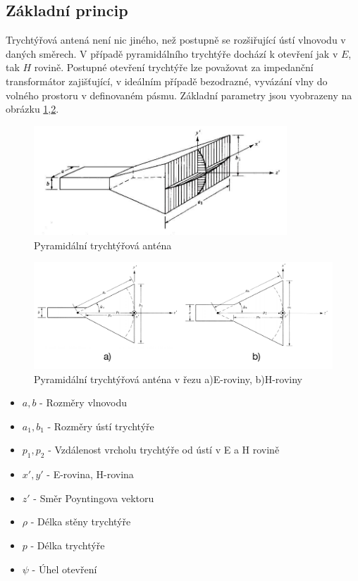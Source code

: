 \subsection{Základní princip}
Trychtýřová antená není nic jiného, než postupně se rozšiřující ústí vlnovodu v daných směrech. V případě pyramidálního trychtýře dochází k otevření jak v $E$, tak $H$ rovině. Postupné otevření trychtýře lze považovat za impedanční transformátor zajišťující, v ideálním případě bezodrazné, vyvázání vlny do volného prostoru v definovaném pásmu.
Základní parametry jsou vyobrazeny na obrázku \ref{fig:horn},\ref{fig:hornEH}.

\begin{figure}[h]
\begin{center}
\includegraphics[width=9.5cm]{pics/horn}
\caption{Pyramidální trychtýřová anténa \cite{ConstantineTheory}}
\label{fig:horn}
\end{center}
\end{figure}

\begin{figure}[h]
\begin{center}
\includegraphics[width=15cm]{pics/hornEH}
\caption{Pyramidální trychtýřová anténa v řezu a)E-roviny, b)H-roviny \cite{ConstantineTheory}}
\label{fig:hornEH}
\end{center}
\end{figure}
\begin{itemize}
\item $a, b$ - Rozměry vlnovodu
\item $a_1, b_1$ - Rozměry ústí trychtýře
\item $p_1, p_2$ - Vzdálenost vrcholu trychtýře od ústí v E a H rovině
\item $x', y'$ - E-rovina, H-rovina
\item $z'$ - Směr Poyntingova vektoru
\item $\rho$ - Délka stěny trychtýře
\item $p$ - Délka trychtýře
\item $\psi$ - Úhel otevření
\end{itemize}

